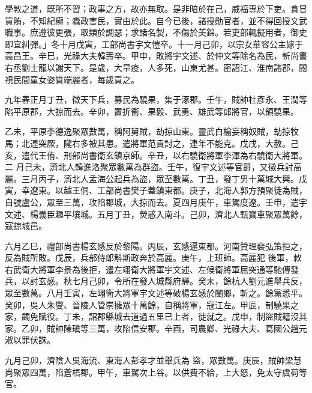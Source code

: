 \begin{pinyinscope}
 學敩之道，既所不習；政事之方，故亦無取。是非暗於在己，威福專於下吏。貪冒貨賄，不知紀極；蠹政害民，實由於此。自今已後，諸授勛官者，並不得回授文武職事。庶遵彼更張，取類於調瑟；求諸名製，不傷於美錦。若吏部輒擬用者，御史即宜糾彈。」冬十月戊寅，工部尚書宇文愷卒。十一月己卯，以宗女華容公主嫁于高昌王。辛巳，光祿大夫韓壽卒。甲申，敗將宇文述、於仲文等除名為民，斬尚書
 右丞劉士龍以謝天下。是歲，大旱疫，人多死，山東尤甚。密詔江、淮南諸郡，閱視民間童女姿質端麗者，每歲貢之。



 九年春正月丁丑，徵天下兵，募民為驍果，集于涿郡。壬午，賊帥杜彥永、王潤等陷平原郡，大掠而去。辛卯，置折衝、果毅、武勇、雄武等郎將官，以領驍果。



 乙未，平原李德逸聚眾數萬，稱阿舅賊，劫掠山東。靈武白榆妄稱奴賊，劫掠牧馬；北連突厥，隴右多被其患。遣將軍范貴討之，連年不能克。戊戌，大赦。己亥，遣代王侑、刑部尚書衛玄鎮京師。辛丑，以右驍衛將軍李渾為右驍衛大將軍。二
 月己未，濟北人韓進洛聚眾數萬為群盜。壬午，復宇文述等官爵，又徵兵討高麗。三月丙子，濟北人孟海公起兵為盜，眾至數萬。丁丑，發丁男十萬城大興。戊寅，幸遼東。以越王侗、工部尚書樊子蓋鎮東都。庚子，北海人郭方預聚徒為賊，自號盧公，眾至三萬，攻陷郡城，大掠而去。夏四月庚午，車駕度遼。壬申，遣宇文述、楊義臣趣平壤城。五月丁丑，熒惑入南斗。己卯，濟北人甄寶車聚眾萬餘，寇掠城邑。



 六月乙巳，禮部尚書楊玄感反於黎陽。丙辰，玄感逼東都。河南贊理裴弘策拒之，反為賊所敗。戊辰，兵部侍郎斛斯政奔於高麗。庚午，上班師。高麗犯
 後軍，敕右武衛大將軍李景為後拒，遣左翊衛大將軍宇文述、左候衛將軍屈突通等馳傳發兵，以討玄感。秋七月己卯，令所在發人城縣府驛。癸未，餘杭人劉元進舉兵反，眾至數萬。八月壬寅，左翊衛大將軍宇文述等破楊玄感於閿鄉，斬之。餘黨悉平。癸卯，吳人朱燮、晉陵人管崇擁眾十萬餘，自稱將軍，寇江左。甲辰，制驍果之家，蠲免賦役。丁未，詔郡縣城去道過五里已上者，徙就之。戊申，制盜賊籍沒其家。乙卯，賊帥陳瑱等三萬，攻陷信安郡。辛酉，司農卿、光祿大夫、葛國公趙元淑以罪伏誅。



 九月己卯，濟陰人吳海流、東海人彭孝才並舉兵為
 盜，眾數萬。庚辰，賊帥梁慧尚聚眾四萬，陷蒼梧郡。甲午，車駕次上谷。以供費不給，上大怒，免太守虞荷等官。




\end{pinyinscope}
